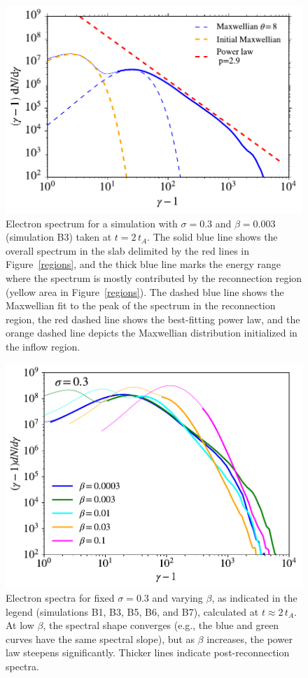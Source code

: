 \begin{figure}[!t]
	\centering
	\includegraphics[width =\textwidth]{single_powerlaw_fit.pdf}
	\caption{Electron spectrum for a simulation with $\sigma=0.3$ and $\beta=0.003$ (simulation B3) taken at $t=2\,t_{A}$.  The solid blue line shows the overall spectrum in the slab delimited by the red lines in Figure~\ref{regions}, and the thick blue line marks the energy range where the spectrum is mostly contributed by the reconnection region (yellow area in Figure~\ref{regions}).  The dashed blue line shows the Maxwellian fit to the peak of the spectrum in the reconnection region, the red dashed line shows the best-fitting power law, and the orange dashed line depicts the  Maxwellian distribution initialized in the inflow region.}
\label{spec_fit_ex}
\end{figure}


\begin{figure}[!b]
	\centering
	\includegraphics[width =\textwidth]{sig_3_betas_withcold.pdf}
	\caption{Electron spectra for fixed $\sigma=0.3$ and varying $\beta$, as indicated in the legend (simulations B1, B3, B5, B6, and B7), calculated at $t\approx 2\,t_{A}$.  At low $\beta$, the spectral shape converges (e.g., the blue and green curves have the same spectral slope), but as $\beta$ increases, the power law steepens significantly. Thicker lines indicate post-reconnection spectra.}
    \label{sig_3_betas_lecs}
\end{figure}

